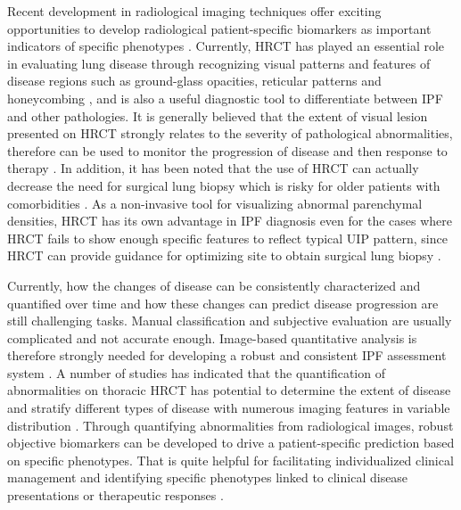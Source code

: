 Recent development in radiological imaging techniques offer exciting opportunities to develop radiological patient-specific biomarkers as important indicators of specific phenotypes \citep{devaraj2014imaging,gotway2007challenges}. Currently, HRCT has played an essential role in evaluating lung disease through recognizing visual patterns and features of disease regions such as ground-glass opacities, reticular patterns and honeycombing \citep{mueller2007every}, and is also a useful diagnostic tool to differentiate between IPF and other pathologies. It is generally believed that the extent of visual lesion presented on HRCT strongly relates to the severity of pathological abnormalities, therefore can be used to monitor the progression of disease and then response to therapy \citep{kazerooni1997thin,kim1999nonspecific,wells2003idiopathic,saketkoo2011developing}. In addition, it has been noted that the use of HRCT can actually decrease the need for surgical lung biopsy which is risky for older patients with comorbidities \citep{bartholmai2013quantitative}. As a non-invasive tool for visualizing abnormal parenchymal densities, HRCT has its own advantage in IPF diagnosis even for the cases where HRCT fails to show enough specific features to reflect typical UIP pattern, since HRCT can provide guidance for optimizing site to obtain surgical lung biopsy \citep{kazerooni2001high, diette2005high, misumi2006idiopathic, costabel2007diffuse}. 

Currently, how the changes of disease can be consistently characterized and quantified over time and how these changes can predict disease progression are still challenging tasks. Manual classification and subjective evaluation are usually complicated and not accurate enough. Image-based quantitative analysis is therefore strongly needed for developing a robust and consistent IPF assessment system \citep{gotway2007challenges,lynch2005high}. A number of studies has indicated that the quantification of abnormalities on thoracic HRCT has potential to determine the extent of disease and stratify different types of disease with numerous imaging features in variable distribution \citep{best2008idiopathic,wells2003idiopathic, sumikawa2008computed, bartholmai2013quantitative}. Through quantifying abnormalities from radiological images, robust objective biomarkers can be developed to drive a patient-specific prediction based on specific phenotypes. That is quite helpful for facilitating individualized clinical management and identifying specific phenotypes linked to clinical disease presentations or therapeutic responses \citep{raghunath2014quantitative}.
\newpage

